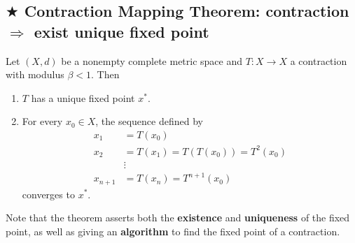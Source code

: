 \documentclass[11pt]{elegantbook}
\begin{document}
\subsection{$\bigstar$ Contraction Mapping Theorem: contraction $\Rightarrow$ exist unique fixed point}
\begin{theorem}
    Let $(X, d)$ be a nonempty complete metric space and $T : X \rightarrow X$ a contraction with modulus $\beta < 1$. Then
    \begin{enumerate}
        \item $T$ has a unique fixed point $x^*$.
        \item For every $x_0 \in X$, the sequence defined by
        \begin{equation}
            \begin{aligned}
                x_1&=T(x_0)\\
                x_2&=T(x_1)=T(T(x_0))=T^2(x_0)\\
                &\vdots\\
                x_{n+1}&=T(x_n)=T^{n+1}(x_0)
            \end{aligned}
            \nonumber
        \end{equation}
        converges to $x^*$.
    \end{enumerate}
\end{theorem}
Note that the theorem asserts both the \textbf{existence} and \textbf{uniqueness} of the fixed point, as well as giving an \textbf{algorithm} to find the fixed point of a contraction.
\end{document}
